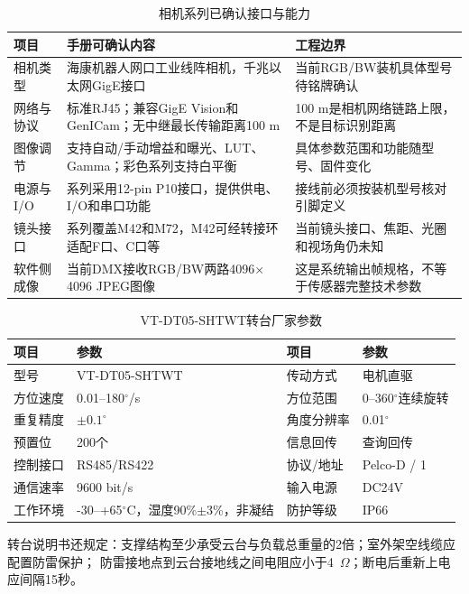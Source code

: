 \documentclass[UTF8,a4paper,11pt,openany]{ctexrep}
\begin{document}
\begin{table}[H]
  \centering
  \small
  \caption{相机系列已确认接口与能力}
  \begin{tabularx}{\textwidth}{p{3.7cm}X p{4.4cm}}
    \toprule
    项目 & 手册可确认内容 & 工程边界 \\
    \midrule
    相机类型 & 海康机器人网口工业线阵相机，千兆以太网GigE接口 & 当前RGB/BW装机具体型号待铭牌确认 \\
    网络与协议 & 标准RJ45；兼容GigE Vision和GenICam；无中继最长传输距离100 m & 100 m是相机网络链路上限，不是目标识别距离 \\
    图像调节 & 支持自动/手动增益和曝光、LUT、Gamma；彩色系列支持白平衡 & 具体参数范围和功能随型号、固件变化 \\
    电源与I/O & 系列采用12-pin P10接口，提供供电、I/O和串口功能 & 接线前必须按装机型号核对引脚定义 \\
    镜头接口 & 系列覆盖M42和M72，M42可经转接环适配F口、C口等 & 当前镜头接口、焦距、光圈和视场角仍未知 \\
    软件侧成像 & 当前DMX接收RGB/BW两路4096$\times$4096 JPEG图像 & 这是系统输出帧规格，不等于传感器完整技术参数 \\
    \bottomrule
  \end{tabularx}
\end{table}

\begin{table}[H]
  \centering
  \small
  \caption{VT-DT05-SHTWT转台厂家参数}
  \begin{tabularx}{\textwidth}{p{3.5cm}p{4.2cm}p{3.5cm}X}
    \toprule
    项目 & 参数 & 项目 & 参数 \\
    \midrule
    型号 & VT-DT05-SHTWT & 传动方式 & 电机直驱 \\
    方位速度 & 0.01--180$^\circ$/s & 方位范围 & 0--360$^\circ$连续旋转 \\
    重复精度 & $\pm0.1^\circ$ & 角度分辨率 & 0.01$^\circ$ \\
    预置位 & 200个 & 信息回传 & 查询回传 \\
    控制接口 & RS485/RS422 & 协议/地址 & Pelco-D / 1 \\
    通信速率 & 9600 bit/s & 输入电源 & DC24V \\
    工作环境 & -30--+65$^\circ$C，湿度90\%$\pm$3\%，非凝结 & 防护等级 & IP66 \\
    \bottomrule
  \end{tabularx}
\end{table}

转台说明书还规定：支撑结构至少承受云台与负载总重量的2倍；室外架空线缆应配置防雷保护；
防雷接地点到云台接地线之间电阻应小于4~$\Omega$；断电后重新上电应间隔15秒。
\end{document}
